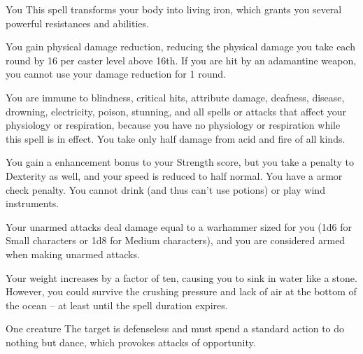 \spelldur{\durshort \dismissable}
\begin{spelltarget}{You}
    \spelleffect This spell transforms your body into living iron, which grants you several powerful resistances and abilities.
    \par You gain physical damage reduction, reducing the physical damage you take each round by 16  per caster level above 16th. If you are hit by an adamantine weapon, you cannot use your damage reduction for 1 round.
    \par You are immune to blindness, critical hits, attribute damage, deafness, disease, drowning, electricity, poison, stunning, and all spells or attacks that affect your physiology or respiration, because you have no physiology or respiration while this spell is in effect. You take only half damage from acid and fire of all kinds.
    \par You gain a  enhancement bonus to your Strength score, but you take a  penalty to Dexterity as well, and your speed is reduced to half normal. You have a  armor check penalty. You cannot drink (and thus can't use potions) or play wind instruments.
    \par Your unarmed attacks deal damage equal to a warhammer sized for you (1d6 for Small characters or 1d8 for Medium characters), and you are considered armed when making unarmed attacks.
    \par Your weight increases by a factor of ten, causing you to sink in water like a stone. However, you could survive the crushing pressure and lack of air at the bottom of the ocean -- at least until the spell duration expires.
\end{spelltarget}

\spellrng{\rngclose}
\begin{spelltarget}{One creature}
    \spelleffect The target is defenseless and must spend a standard action to do nothing but dance, which provokes attacks of opportunity.
\end{spelltarget}

\begin{comment}
\subsubsection{J-L}
\end{comment}

